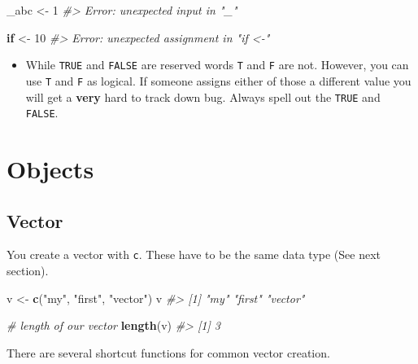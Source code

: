 \documentclass[]{book}
\newenvironment{Shaded}{\begin{snugshade}}{\end{snugshade}}
\newcommand{\CommentTok}[1]{\textcolor[rgb]{0.56,0.35,0.01}{\textit{#1}}}
\newcommand{\ControlFlowTok}[1]{\textcolor[rgb]{0.13,0.29,0.53}{\textbf{#1}}}
\newcommand{\DecValTok}[1]{\textcolor[rgb]{0.00,0.00,0.81}{#1}}
\newcommand{\KeywordTok}[1]{\textcolor[rgb]{0.13,0.29,0.53}{\textbf{#1}}}
\newcommand{\NormalTok}[1]{#1}
\newcommand{\StringTok}[1]{\textcolor[rgb]{0.31,0.60,0.02}{#1}}
\newenvironment{rmdblock}[1]
  {\begin{shaded*}
  \begin{itemize}
  \renewcommand{\labelitemi}{
    \raisebox{-.7\height}[0pt][0pt]{
      {\setkeys{Gin}{width=3em,keepaspectratio}\texttt{[image: images/\#1]}}
    }
  }
  \item
  }
  {
  \end{itemize}
  \end{shaded*}
  }
\newenvironment{rmdwarning}
  {\begin{rmdblock}{warning}}
  {\end{rmdblock}}
\theoremstyle{definition}
\theoremstyle{definition}
\theoremstyle{definition}
\theoremstyle{remark}
\begin{document}
\begin{Shaded}
\begin{Highlighting}[]
\NormalTok{_abc <-}\StringTok{ }\DecValTok{1}
\CommentTok{#> Error: unexpected input in "_"}

\ControlFlowTok{if}\NormalTok{ <-}\StringTok{ }\DecValTok{10}
\CommentTok{#> Error: unexpected assignment in "if <-"}
\end{Highlighting}
\end{Shaded}

\begin{rmdwarning}
While \texttt{TRUE} and \texttt{FALSE} are reserved words \texttt{T} and
\texttt{F} are not. However, you can use \texttt{T} and \texttt{F} as
logical. If someone assigns either of those a different value you will
get a \textbf{very} hard to track down bug. Always spell out the
\texttt{TRUE} and \texttt{FALSE}.
\end{rmdwarning}

\hypertarget{objects}{%
\section{Objects}\label{objects}}

\hypertarget{vector}{%
\subsection{Vector}\label{vector}}

You create a vector with \texttt{c}. These have to be the same data type
(See next section).

\begin{Shaded}
\begin{Highlighting}[]
\NormalTok{v <-}\StringTok{ }\KeywordTok{c}\NormalTok{(}\StringTok{"my"}\NormalTok{, }\StringTok{"first"}\NormalTok{, }\StringTok{"vector"}\NormalTok{)}
\NormalTok{v}
\CommentTok{#> [1] "my"     "first"  "vector"}

\CommentTok{# length of our vector}
\KeywordTok{length}\NormalTok{(v)}
\CommentTok{#> [1] 3}
\end{Highlighting}
\end{Shaded}

There are several shortcut functions for common vector creation.
\end{document}

